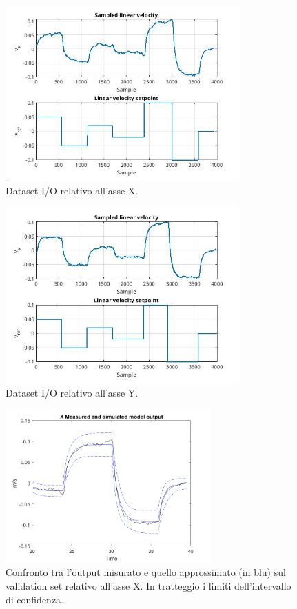 \begin{figure}
    \centering
    \includegraphics[width=0.8\textwidth]{figs/chapter4/xdataset.jpg}
    \caption{Dataset I/O relativo all'asse X.}
    \label{fig:xdataset}
\end{figure}

\begin{figure}
    \centering
    \includegraphics[width=0.8\textwidth]{figs/chapter4/ydataset.jpg}
    \caption{Dataset I/O relativo all'asse Y.}
    \label{fig:ydataset}
\end{figure}

\begin{figure}
    \centering
    \includegraphics[width=0.7\textwidth]{figs/chapter4/valxtimeplot.png}
    \caption{Confronto tra l'output misurato e quello approssimato (in blu) sul validation set relativo all'asse X. In tratteggio i limiti dell'intervallo di confidenza.}
    \label{fig:xvalerr}
\end{figure}

